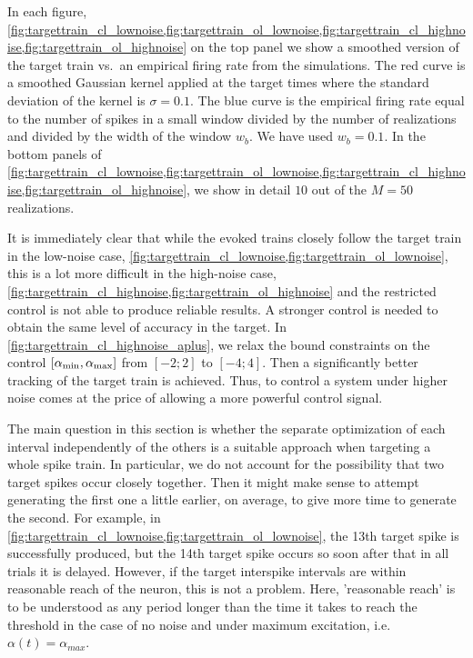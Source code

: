 In each figure,
\cref{fig:targettrain_cl_lownoise,fig:targettrain_ol_lownoise,fig:targettrain_cl_highnoise,fig:targettrain_ol_highnoise}
on the top panel we show a smoothed version of the target train vs.\ an
empirical firing rate from the simulations. The red curve is a smoothed Gaussian
kernel applied at the target times where the standard deviation of the kernel is
$\sigma = 0.1$. The blue curve is the empirical firing rate equal to the number
of spikes in a small window divided by the number of realizations and divided by
the width of the window $w_b$. We have used $w_b = 0.1$. In the bottom panels of
\cref{fig:targettrain_cl_lownoise,fig:targettrain_ol_lownoise,fig:targettrain_cl_highnoise,fig:targettrain_ol_highnoise},
we show in detail $10$ out of the $M=50$ realizations.


It is immediately clear that while the evoked trains closely follow the target
train in the low-noise case,
\cref{fig:targettrain_cl_lownoise,fig:targettrain_ol_lownoise}, this is a lot
more difficult in the high-noise case,
\cref{fig:targettrain_cl_highnoise,fig:targettrain_ol_highnoise} and the
restricted control is not able to produce reliable results. A stronger
control is needed to obtain the same level of accuracy in the target. In
\cref{fig:targettrain_cl_highnoise_aplus}, we relax the bound constraints on the
control $[{ \alpha_{\textrm{min}} }, { \alpha_{\textrm{max}} }]$ from $[-2; 2]$ to $[-4; 4]$. Then a significantly
better tracking of the target train is achieved. Thus, to control a system under
higher noise comes at the price of allowing a more powerful control signal.

The main question in this section is whether the separate optimization of each
interval independently of the others is a suitable approach when targeting a
whole spike train. In particular, we do not account for the possibility that two
target spikes occur closely together. Then it might make sense to attempt
generating the first one a little earlier, on average, to give more time to
generate the second. For example, in
\cref{fig:targettrain_cl_lownoise,fig:targettrain_ol_lownoise}, the 13th target
spike is successfully produced, but the 14th target spike occurs so soon after
that in all trials it is delayed. However, if the target interspike intervals
are within reasonable reach of the neuron, this is not a problem. 
Here, 'reasonable reach' is to be understood as any period longer than
the time it takes to reach the threshold in the case of no noise and
under maximum excitation, i.e. $\alpha (t) = \alpha_{max}$.

% 
 
